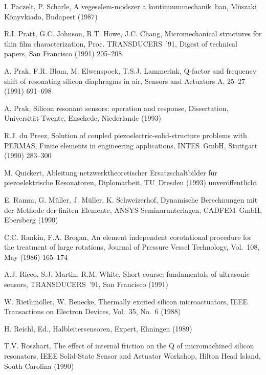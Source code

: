 \begin{thebibliography}{xxx}
  I. Paczelt, P. Scharle, A vegeselem-modszer a kontinuummechanik ban,
 Müszaki Könyvkiado, Budapest (1987)

 R.I. Pratt, G.C. Johnson, R.T. Howe, J.C. Chang, Micromechanical structures
 for thin film characterization, Proc. TRANSDUCERS~'91, Digest of technical
 papers, San Francisco (1991) 205--208

 A. Prak, F.R. Blom, M. Elwenspoek, T.S.J. Lammerink, Q-factor and frequency
 shift of resonating silicon diaphragms in air, Sensors and Actuators A,
 25--27 (1991) 691--698

 A. Prak, Silicon resonant sensors: operation and response, Dissertation,
 Universität Twente, Enschede, Niederlande (1993)

  R.J. du Preez, Solution of coupled piezoelectric-solid-structure problems
  with PERMAS, Finite elements in engineering applications, INTES~GmbH,
  Stuttgart (1990) 283--300

 M. Quickert, Ableitung netzwerktheoretischer Ersatzschaltbilder für
 piezoelektrische Resonatoren, Diplomarbeit, TU~Dresden (1993)
 unveröffentlicht

 E. Ramm, G. Müller, J. Müller, K. Schweizerhof,
 Dynamische Berechnungen mit der Methode der finiten Elemente,
 {\sf ANSYS}-Seminarunterlagen, CADFEM~GmbH, Ebersberg (1990)

 C.C. Rankin, F.A. Brogan, An element independent corotational procedure
 for the treatment of large rotations, Journal of Pressure Vessel Technology,
 Vol.~108, May (1986) 165--174

 A.J. Ricco, S.J. Martin, R.M. White, Short course: fundamentals of
 ultrasonic sensors, TRANSDUCERS~'91, San Francisco (1991)

 W. Riethmöller, W. Benecke, Thermally excited silicon microactuators,
 IEEE Transactions on Electron Devices, Vol.~35, No.~6 (1988)

 H. Reichl, Ed., Halbleitersensoren, Expert, Ehningen (1989)

 T.V. Roszhart, The effect of internal friction on the Q of micromachined
 silicon resonators, IEEE Solid-State Sensor and Actuator Workshop,
 Hilton Head Island, South Carolina (1990)


\end{thebibliography}
